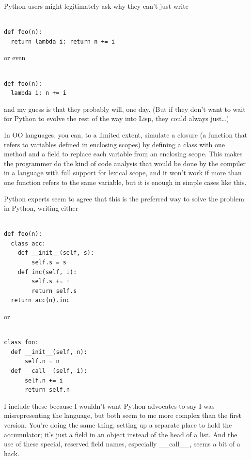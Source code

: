 \documentclass[12pt]{book}
\begin{document}
Python users might legitimately ask why they can't just write

\begin{verbatim}

def foo(n):
  return lambda i: return n += i
\end{verbatim}

or even

\begin{verbatim}

def foo(n):
  lambda i: n += i
\end{verbatim}

and my guess is that they probably will, one day. (But if they don't
want to wait for Python to evolve the rest of the way into Lisp, they
could always just\ldots)

In OO languages, you can, to a limited extent, simulate a closure (a
function that refers to variables defined in enclosing scopes) by
defining a class with one method and a field to replace each variable
from an enclosing scope. This makes the programmer do the kind of code
analysis that would be done by the compiler in a language with full
support for lexical scope, and it won't work if more than one function
refers to the same variable, but it is enough in simple cases like this.

Python experts seem to agree that this is the preferred way to solve the
problem in Python, writing either

\begin{verbatim}

def foo(n):
  class acc:
    def __init__(self, s):
        self.s = s
    def inc(self, i):
        self.s += i
        return self.s
  return acc(n).inc
\end{verbatim}

or

\begin{verbatim}

class foo:
  def __init__(self, n):
      self.n = n
  def __call__(self, i):
      self.n += i
      return self.n
\end{verbatim}

I include these because I wouldn't want Python advocates to say I was
misrepresenting the language, but both seem to me more complex than the
first version. You're doing the same thing, setting up a separate place
to hold the accumulator; it's just a field in an object instead of the
head of a list. And the use of these special, reserved field names,
especially \_\_call\_\_, seems a bit of a hack.
\end{document}
